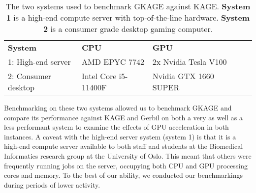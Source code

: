 \vspace{1em}
\begin{table}[H]
\begin{center}
\begin{tabular}{lllll}
\multicolumn{1}{l|}{\textbf{System}} & \multicolumn{1}{l}{\textbf{CPU}}                  & \multicolumn{1}{l}{\textbf{GPU}}                   &  \\ \cline{1-3}
\multicolumn{1}{l|}{1: High-end server} & \multicolumn{1}{l}{AMD EPYC 7742}        & \multicolumn{1}{l}{2x Nvidia Tesla V100}     &  \\ 
\multicolumn{1}{l|}{2: Consumer desktop} & \multicolumn{1}{l}{Intel Core i5-11400F} & \multicolumn{1}{l}{Nvidia GTX 1660 SUPER} &  \\
\end{tabular}
\end{center}
\caption{
  The two systems used to benchmark GKAGE against KAGE.
  \textbf{System 1} is a high-end compute server with top-of-the-line hardware.
  \textbf{System 2} is a consumer grade desktop gaming computer.
}
\label{methods:benchmarking_setup:systems:tables:systems}
\end{table}

Benchmarking on these two systems allowed us to benchmark GKAGE and compare its performance against KAGE and Gerbil on both a very as well as a less performant system to examine the effects of GPU acceleration in both instances.
A caveat with the high-end server system (system 1) is that it is a high-end compute server available to both staff and students at the Biomedical Informatics research group at the University of Oslo.
This meant that others were frequently running jobs on the server, occupying both CPU and GPU processing cores and memory.
To the best of our ability, we conducted our benchmarkings during periods of lower activity.
